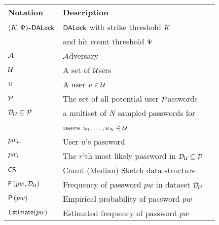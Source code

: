 \begin{table}[htb]
	
	\begin{tabular}{|l|l|l|}\hline
		
		Notation      & Description                                                                   \\\hline
		
		$(K, \Psi)$-$\mathsf{DALock}$  & $\mathsf{DALock}$ with strike threshold $K$                 \\        
		& and hit count threshold $\Psi$    \\\hline
		$\mathcal{A}$  & \underline{$\mathcal{A}$}dversary                            \\\hline
		
		$\mathcal{U}$ & A set of {$\mathcal{U}$}sers           \\\hline
		
		$u$           & A user  $u \in \mathcal{U}$                                                    \\\hline
		
		$\mathcal{P}$ & The set of all potential user \underline{$\mathcal{P}$}asswords \\\hline
		
		$\mathcal{D}_{{\mathcal{U}}} \subseteq \mathcal{P}$ & a multiset of $N$ sampled passwords  for\\
		
		& users $u_1,\ldots,u_N \in \mathcal{U}$ \\ \hline
		
		$pw_{u}$         & User $u$'s password   \\\hline
		
		$pw_{r}$         & The $r$'th most likely password in $\mathcal{D}_{{\mathcal{U}}} \subseteq \mathcal{P}$ \\\hline
		
		$\mathsf{CS}$ & \underline{C}ount (Median) \underline{S}ketch data structure\\    \hline    	
		
		$\mathsf{F}\left(pw, \mathcal{D}_{{\mathcal{U}}}\right)$ & Frequency of password $pw$ in dataset $\mathcal{D}_{{\mathcal{U}}}$ \\\hline
		
		$\mathsf{P}\left(pw\right)$ & Empirical probability of password $pw$  \\\hline        
		
		$\textsf{Estimate}(pw)$ & Estimated frequency of password $pw$\\\hline
		

\end{tabular}
\end{table}
